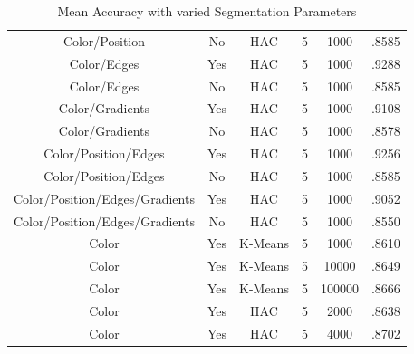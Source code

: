 \documentclass[12pt]{article}
\begin{document}
\begin{table}[H]
\begin{adjustbox}{width=\columnwidth,center}
\begin{tabular}{c c c c c c}
			Color/Position & No & HAC & 5 & 1000 & .8585 \\
			Color/Edges & Yes & HAC & 5 & 1000 & .9288 \\
			Color/Edges & No & HAC & 5 & 1000 & .8585 \\
			Color/Gradients & Yes & HAC & 5 & 1000 & .9108 \\
			Color/Gradients & No & HAC & 5 & 1000 & .8578 \\
			Color/Position/Edges & Yes & HAC & 5 & 1000 & .9256 \\
			Color/Position/Edges & No & HAC & 5 & 1000 & .8585 	\\
			Color/Position/Edges/Gradients & Yes & HAC & 5 & 1000 & .9052 \\
			Color/Position/Edges/Gradients & No & HAC & 5 & 1000 & .8550 \\
			Color & Yes & K-Means & 5 & 1000 & .8610 \\
			Color & Yes & K-Means & 5 & 10000 & .8649 \\
			Color & Yes & K-Means & 5 & 100000 & .8666 \\
			Color & Yes & HAC & 5 & 2000 & .8638 \\
			Color & Yes & HAC & 5 & 4000 & .8702 \\ \hline
		\end{tabular}
	\end{adjustbox}
	\caption{Mean Accuracy with varied Segmentation Parameters}
\end{table}
\end{document}
